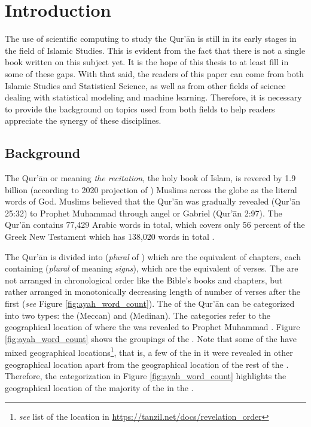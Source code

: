 \chapter{Introduction}
\label{ch:introduction}
The use of scientific computing to study the Qur'\=an is still in its early stages in the field of Islamic Studies. This is evident from the fact that there is not a single book written on this subject yet. It is the hope of this thesis to at least fill in some of these gaps. With that said, the readers of this paper can come from both Islamic Studies and Statistical Science, as well as from other fields of science dealing with statistical modeling and machine learning. Therefore, it is necessary to provide the background on topics used from both fields to help readers appreciate the synergy of these disciplines.

\section{Background}
The Qur'\=an or   meaning \textit{the recitation}, the holy book of Islam, is revered by 1.9 billion (according to 2020 projection of ) Muslims across the globe as the literal words of God. Muslims believed that the Qur'\=an was gradually revealed (Qur'\=an 25:32) to Prophet Muhammad  through angel   or Gabriel (Qur'\=an 2:97). The Qur'\=an contains 77,429 Arabic words in total, which covers only 56 percent of the Greek New Testament which has 138,020 words in total \cite[p.~11]{sinai2017}. 

The Qur'\=an is divided into   (\textit{plural} of  ) which are the equivalent of chapters, each containing   (\textit{plural} of   meaning \textit{signs}), which are the equivalent of verses. The   are not arranged in chronological order like the Bible's books and chapters, but rather arranged in monotonically decreasing length of number of verses after the first   (\textit{see} Figure \ref{fig:ayah_word_count}). The   of the Qur'\=an can be categorized into two types: the   (Meccan) and   (Medinan). The categories refer to the geographical location of where the   was revealed to Prophet Muhammad . Figure \ref{fig:ayah_word_count} shows the groupings of the  . Note that some of the   have mixed geographical locations\footnote{\textit{see} list of the location in \url{https://tanzil.net/docs/revelation_order}}, that is, a few of the   in it were revealed in other geographical location apart from the geographical location of the rest of the  . Therefore, the categorization in Figure \ref{fig:ayah_word_count} highlights the geographical location of the majority of the   in the  .

